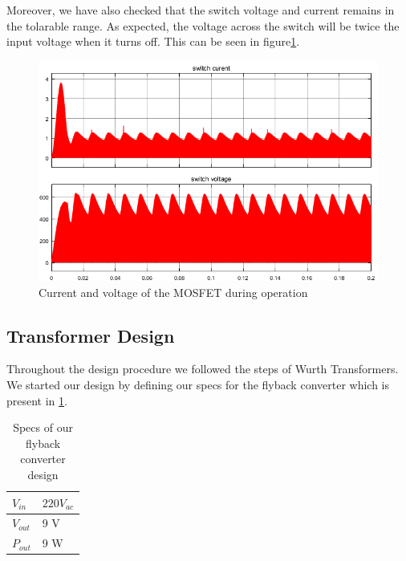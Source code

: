 \documentclass[12pt]{article}
\begin{document}
Moreover, we have also checked that the switch voltage and current remains in the tolarable range. As expected, the voltage across the switch will be twice the input voltage when it turns off. This can be seen in figure\ref{fig:switch}.

\begin{figure}[H]
    \centering
    \includegraphics[width=15 cm]{switch_stress_snubbereffect}
    \caption{Current and voltage of the MOSFET during operation}
    \label{fig:switch}
\end{figure}

\subsection{Transformer Design}

Throughout the design procedure we followed the steps of Wurth Transformers.\\
We started our design by defining our specs for the flyback converter which is present in \ref{tab:spec}.
\begin{table}[H]
\centering

\label{tab:spec}
\begin{tabular}{|l|l|}
\caption{Specs of our flyback converter design}
\hline
$V_{in} $ & $220 V_{ac}$ \\ \hline
$V_{out}$ & 9 V           \\ \hline
$P_{out}$ & 9 W           \\ \hline
\end{tabular}

\end{table}
\end{document}
